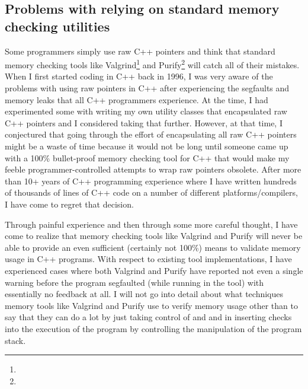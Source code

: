 \documentclass[pdf,ps2pdf,11pt]{SANDreport}
\begin{document}
%
{}\subsection{Problems with relying on standard memory checking
utilities}
\label{sec:problems-with-mem-checkers}
%

Some programmers simply use raw C++ pointers and think that standard
memory checking tools like
Valgrind\footnote{{}} and
Purify\footnote{}
will catch all of their mistakes.  When I first started coding in C++
back in 1996, I was very aware of the problems with using raw pointers
in C++ after experiencing the segfaults and memory leaks that all C++
programmers experience.  At the time, I had experimented some with
writing my own utility classes that encapsulated raw C++ pointers and
I considered taking that further.  However, at that time, I
conjectured that going through the effort of encapsulating all raw C++
pointers might be a waste of time because it would not be long until
someone came up with a 100\% bullet-proof memory checking tool for C++
that would make my feeble programmer-controlled attempts to wrap raw
pointers obsolete.  After more than 10+ years of C++ programming
experience where I have written hundreds of thousands of lines of C++
code on a number of different platforms/compilers, I have come to
regret that decision.

Through painful experience and then through some more careful thought,
I have come to realize that memory checking tools like Valgrind and
Purify will never be able to provide an even sufficient (certainly not
100\%) means to validate memory usage in C++ programs.  With respect
to existing tool implementations, I have experienced cases where both
Valgrind and Purify have reported not even a single warning before the
program segfaulted (while running in the tool) with essentially no
feedback at all.  I will not go into detail about what techniques
memory tools like Valgrind and Purify use to verify memory usage other
than to say that they can do a lot by just taking control of
{} and {} and in inserting checks into
the execution of the program by controlling the manipulation of the
program stack.
\end{document}
